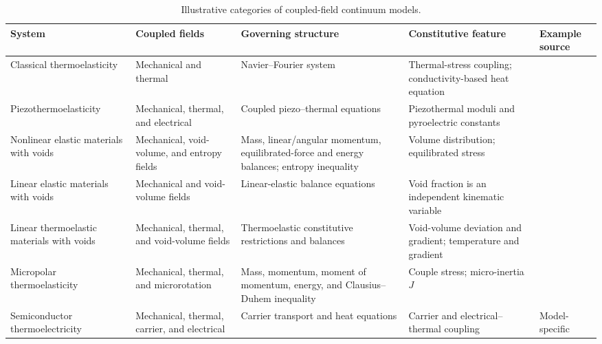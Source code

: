 \begin{table}[htbp]
\centering
\small
\caption{Illustrative categories of coupled-field continuum models.}
\label{tab:T3-multiphysics}
\begin{tabularx}{\textwidth}{@{}p{3.2cm}XXXX@{}}
\toprule
\textbf{System} & \textbf{Coupled fields} & \textbf{Governing structure} & \textbf{Constitutive feature} & \textbf{Example source} \\
\midrule
Classical thermoelasticity & Mechanical and thermal & Navier--Fourier system & Thermal-stress coupling; conductivity-based heat equation & \cite{Biot1956} \\
Piezothermo\-elasticity & Mechanical, thermal, and electrical & Coupled piezo--thermal equations & Piezothermal moduli and pyroelectric constants & \cite{Barak2023} \\
Nonlinear elastic materials with voids & Mechanical, void-volume, and entropy fields & Mass, linear/angular momentum, equilibrated-force and energy balances; entropy inequality & Volume distribution; equilibrated stress & \cite{Nunziato1979} \\
Linear elastic materials with voids & Mechanical and void-volume fields & Linear-elastic balance equations & Void fraction is an independent kinematic variable & \cite{Cowin1983} \\
Linear thermoelastic materials with voids & Mechanical, thermal, and void-volume fields & Thermoelastic constitutive restrictions and balances & Void-volume deviation and gradient; temperature and gradient & \cite{Iesan1986} \\
Micropolar thermoelasticity & Mechanical, thermal, and microrotation & Mass, momentum, moment of momentum, energy, and Clausius--Duhem inequality & Couple stress; micro-inertia $J$ & \cite{TauchertClausAriman1968} \\
Semiconductor thermoelectricity & Mechanical, thermal, carrier, and electrical & Carrier transport and heat equations & Carrier and electrical--thermal coupling & Model-specific \\
\bottomrule
\end{tabularx}
\par{}
\end{table}
